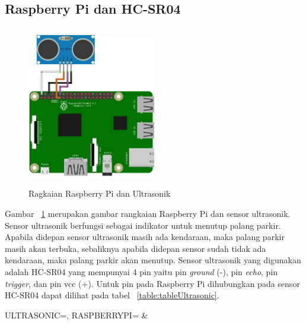 \subsection{Raspberry Pi dan HC-SR04}
\begin{figure} [H]
    \includegraphics[height=7cm, width=0.5\textwidth, center]{images/skematik_ultra.jpg}
    \caption{Ragkaian Raspberry Pi dan Ultrasonik}
    \label{fig:skematikUltrasonik}
\end{figure}

Gambar ~\ref{fig:skematikUltrasonik} merupakan gambar rangkaian Raspberry Pi dan sensor ultrasonik. Sensor ultrasonik berfungsi sebagai indikator untuk menutup palang parkir. Apabila didepan sensor ultrasonik masih ada kendaraan, maka palang parkir masih akan terbuka, sebaliknya apabila didepan sensor sudah tidak ada kendaraan, maka palang parkir akan menutup. Sensor ultrasonik yang digunakan adalah HC-SR04 yang mempunyai 4 pin yaitu pin \textit{ground} (-), pin \textit{echo}, pin \textit{trigger}, dan pin vcc (+). Untuk pin pada Raspberry Pi dihubungkan pada sensor HC-SR04 dapat dilihat pada tabel ~\ref{table:tableUltrasonic}.\newline

\begin{atable}
    \caption{Rangkaian pin Ultrasonik ke Raspberry Pi}
    \label{table:tableUltrasonic}
        {
            ULTRASONIC=\ULTRASONIC, 
            RASPBERRYPI=\RASPBERRYPI}
        {
            \ULTRASONIC & 
            \RASPBERRYPI}
\end{atable}

